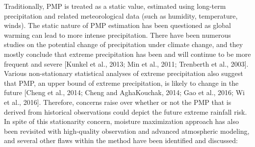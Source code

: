 Traditionally, PMP is treated as a static value, estimated using long-term precipitation and related meteorological data (such as humidity, temperature, winds). The static nature of PMP estimation has been questioned as global warming can lead to more intense precipitation. There have been numerous studies on the potential change of precipitation under climate change, and they mostly conclude that extreme precipitation has been and will continue to be more frequent and severe [Kunkel et al., 2013; Min et al., 2011; Trenberth et al., 2003]. Various non-stationary statistical analyses of extreme precipitation also suggest that PMP, an upper bound of extreme precipitation, is likely to change in the future [Cheng et al., 2014; Cheng and AghaKouchak, 2014; Gao et al., 2016; Wi et al., 2016]. Therefore, concerns raise over whether or not the PMP that is derived from historical observations could depict the future extreme rainfall risk. 
In spite of this stationarity concern, moisture maximization approach has also been revisited with high-quality observation and advanced atmospheric modeling, and several other flaws within the method have been identified and discussed:

